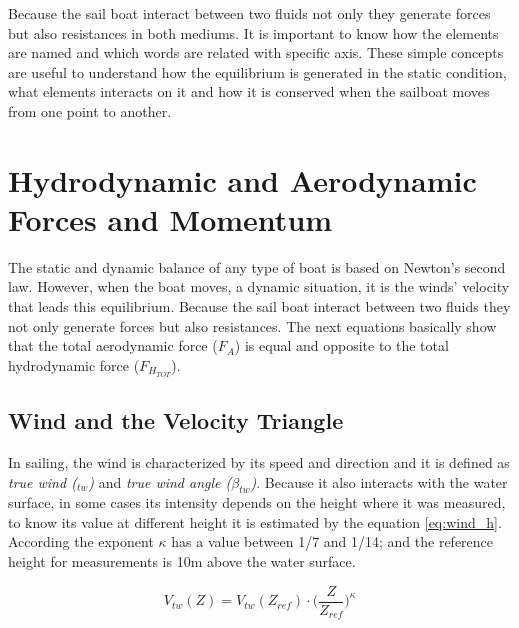 Because the sail boat interact between two fluids not only they generate forces but also resistances in both mediums. It is important to know how the elements are named and which words are related with specific axis.  These simple concepts are useful to understand how the equilibrium is generated in the static condition, what elements interacts on it and how it is conserved when the sailboat moves from one point to another. \par 

\section{Hydrodynamic and Aerodynamic Forces and Momentum} \label{section:forces_moment}
The static and dynamic balance of any type of boat is based on Newton's second law. However, when the boat moves, a dynamic situation, it is the winds' velocity that leads this equilibrium. Because the sail boat interact between two fluids they not only  generate forces but also resistances.
The next equations basically show that the total aerodynamic force ($F_{A}$) is equal and opposite to the total hydrodynamic force ($F_{H_{TOT}}$). \par

\subsection{Wind and the Velocity Triangle} \label{subsec:wind_vel_trian}
In sailing, the wind is characterized by its speed and direction and it is defined as \textit{true wind ($_{tw}$)} and \textit{true wind angle ($\beta_{tw}$)}.  Because it also interacts with the water surface, in some cases its intensity depends on the height where it was measured, to know its value at different height it is estimated by the equation \ref{eq:wind_h}. According \cite{claughton1998sailing} the exponent $\kappa$ has a value between 1/7 and 1/14; and the reference height for measurements is 10m above the water surface. \par 
\begin{equation} \label{eq:wind_h}
    V_{tw}(Z)=V_{tw}(Z_{ref}) \cdot \bigg( \frac{Z}{Z_{ref}} \bigg)^\kappa
\end{equation}

